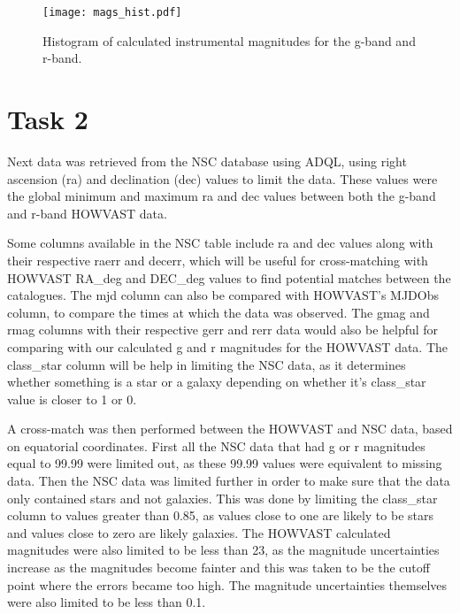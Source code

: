 \documentclass{article}
\begin{document}
\clearpage

\begin{figure}
\centering
\texttt{[image: mags\_hist.pdf]}
\caption{Histogram of calculated instrumental magnitudes for the g-band and r-band.}
\label{fig:MagsHist}
\end{figure}



\section*{Task 2}

Next data was retrieved from the NSC database using ADQL, using right ascension (ra) and declination (dec) values to limit the data. These values were the global minimum and maximum ra and dec values between both the g-band and r-band HOWVAST data. 

Some columns available in the NSC table include ra and dec values along with their respective raerr and decerr, which will be useful for cross-matching with HOWVAST RA\_deg and DEC\_deg values to find potential matches between the catalogues. The mjd column can also be compared with HOWVAST's MJDObs column, to compare the times at which the data was observed. The gmag and rmag columns with their respective gerr and rerr data would also be helpful for comparing with our calculated g and r magnitudes for the HOWVAST data. The class\_star column will be help in limiting the NSC data, as it determines whether something is a star or a galaxy depending on whether it's class\_star value is closer to 1 or 0. 

A cross-match was then performed between the HOWVAST and NSC data, based on equatorial coordinates. First all the NSC data that had g or r magnitudes equal to 99.99 were limited out, as these 99.99 values were equivalent to missing data. Then the NSC data was limited further in order to make sure that the data only contained stars and not galaxies. This was done by limiting the class\_star column to values greater than 0.85, as values close to one are likely to be stars and values close to zero are likely galaxies. The HOWVAST calculated magnitudes were also limited to be less than 23, as the magnitude uncertainties increase as the magnitudes become fainter and this was taken to be the cutoff point where the errors became too high. The magnitude uncertainties themselves were also limited to be less than 0.1.
\end{document}
